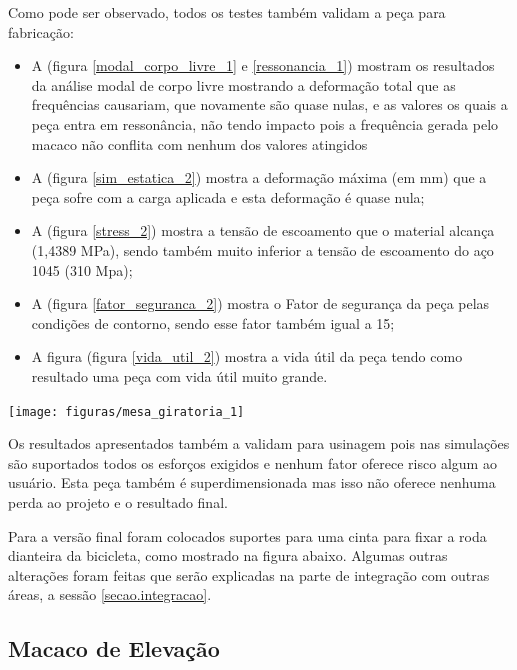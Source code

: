     Como pode ser observado, todos os testes também validam a peça para fabricação:
    \begin{itemize}
        \item A (figura \ref{modal_corpo_livre_1} e  \ref{ressonancia_1}) mostram os resultados da análise modal de corpo livre mostrando a deformação total que as frequências causariam, que novamente são quase nulas, e as valores os quais a peça entra em ressonância, não tendo impacto pois a frequência gerada pelo macaco não conflita com nenhum dos valores atingidos
        \item A (figura \ref{sim_estatica_2}) mostra a deformação máxima (em mm) que a peça sofre com a carga aplicada e esta deformação é quase nula;
        \item A (figura \ref{stress_2}) mostra a tensão de escoamento que o material alcança (1,4389 MPa), sendo também muito inferior a tensão de escoamento do aço 1045 (310 Mpa);
        \item A (figura \ref{fator_seguranca_2}) mostra o Fator de segurança da peça pelas condições de contorno, sendo esse fator também igual a 15;
        \item A figura (figura \ref{vida_util_2}) mostra a vida útil da peça tendo como resultado uma peça com vida útil muito grande.
    \end{itemize}

    \begin{center}
    	\texttt{[image: figuras/mesa\_giratoria\_1]}
        \label{mesa_giratoria_1}
    \end{center}

    Os resultados apresentados também a validam para usinagem pois nas simulações são suportados todos os esforços exigidos e nenhum fator oferece risco algum ao usuário. Esta peça também é superdimensionada mas isso não oferece nenhuma perda ao projeto e o resultado final.

    Para a versão final foram colocados suportes para uma cinta para fixar a roda dianteira da bicicleta, como mostrado na figura abaixo. Algumas outras alterações foram feitas que serão explicadas na parte de integração com outras áreas, a sessão \ref{secao.integracao}.


\subsection{Macaco de Elevação}

